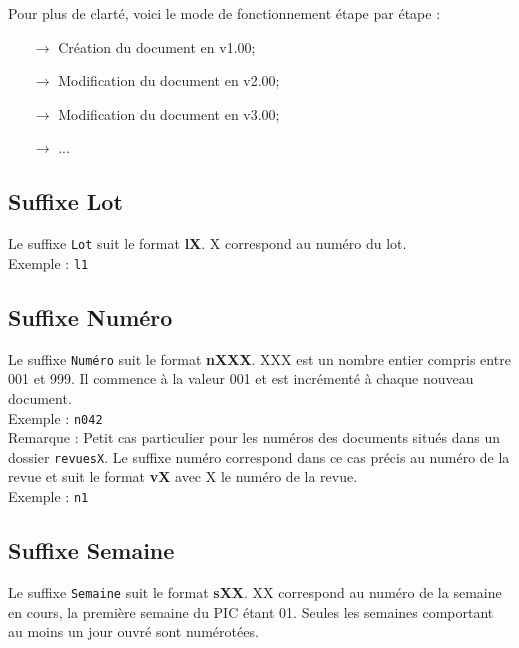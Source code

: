 Pour plus de clarté, voici le mode de fonctionnement étape par étape :
\begin{itemize}
\item[$\rightarrow$] Création du document en v1.00;
\item[$\rightarrow$] Modification du document en v2.00;
\item[$\rightarrow$] Modification du document en v3.00;
\item[$\rightarrow$] ...
\end{itemize}

\subsection{Suffixe Lot}
\label{suffixe_lot}

Le suffixe \verb+Lot+ suit le format \textbf{lX}. X correspond au numéro du lot.\\

Exemple : \verb+l1+\\

\subsection{Suffixe Numéro}
\label{suffixe_numero}

Le suffixe \verb+Numéro+ suit le format \textbf{nXXX}. XXX est un nombre entier compris entre 001 et 999. Il commence à la valeur 001 et est incrémenté à chaque nouveau document.\\

Exemple : \verb+n042+\\

Remarque : Petit cas particulier pour les numéros des documents situés dans un dossier \verb+revuesX+. Le suffixe numéro correspond dans ce cas précis au numéro de la revue et suit le format \textbf{vX} avec X le numéro de la revue.\\

Exemple : \verb+n1+\\

\subsection{Suffixe Semaine}
\label{suffixe_semaine}

Le suffixe \verb+Semaine+ suit le format \textbf{sXX}. XX correspond au numéro de la semaine en cours, la première semaine du PIC étant 01. Seules les semaines comportant au moins un jour ouvré sont numérotées.\\

